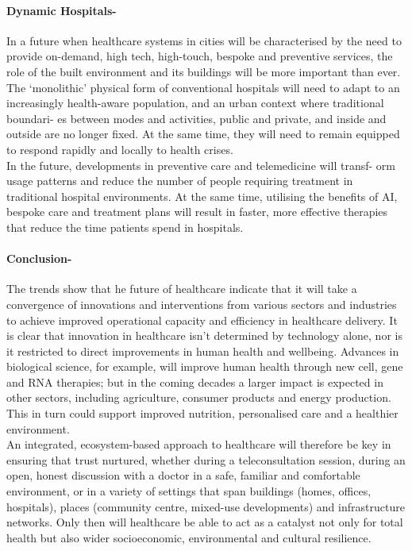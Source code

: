 \documentclass[a4paper,12pt]{extarticle}
\begin{document}
\paragraph{Dynamic Hospitals-} In a future when healthcare systems in cities will be characterised by the need to provide on-demand, high tech, high-touch, bespoke and preventive services, the role of the built environment and its buildings will be more important than ever. The ‘monolithic’ physical form of conventional hospitals will need to adapt to an increasingly health-aware population, and an urban context where traditional boundari- es between modes and activities, public and private, and inside and outside are no longer fixed. At the same time, they will need to remain equipped to respond rapidly and locally to health crises.\\

In the future, developments in preventive care and telemedicine will transf- orm usage patterns and reduce the number of people requiring treatment in traditional hospital environments.
At the same time, utilising the benefits of AI, bespoke care and treatment plans will result in faster, more effective therapies that reduce the time patients spend in hospitals.

\paragraph{Conclusion-} The trends show that he future of healthcare indicate that it will take a convergence of innovations and interventions from various sectors and industries to achieve improved operational capacity and efficiency in healthcare delivery. It is clear that innovation in healthcare isn’t determined by technology alone, nor is it restricted to direct improvements in human health and wellbeing. Advances in biological science, for example, will improve human health through new cell, gene and RNA therapies; but in the coming decades
a larger impact is expected in other sectors, including agriculture, consumer products and energy production. This in turn could support improved nutrition, personalised care and a healthier environment.\\

An integrated, ecosystem-based approach to healthcare will therefore be key in ensuring that trust nurtured, whether during a teleconsultation session, during an open, honest discussion with a doctor in a safe, familiar and comfortable environment, or in a variety of settings that span buildings (homes, offices, hospitals), places (community centre, mixed-use developments) and infrastructure networks. Only then will healthcare be able to act as a catalyst not only for total health but also wider socioeconomic, environmental and cultural resilience.
 




   
\end{document}

